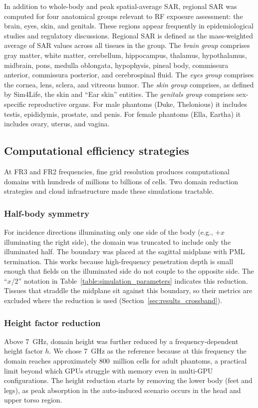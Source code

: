 \documentclass{iopjournal}
\begin{document}
In addition to whole-body and peak spatial-average \gls{SAR}, regional \gls{SAR} was computed for four anatomical groups relevant to \gls{RF} exposure assessment: the brain, eyes, skin, and genitals.
These regions appear frequently in epidemiological studies and regulatory discussions.
Regional \gls{SAR} is defined as the mass-weighted average of \gls{SAR} values across all tissues in the group.
The \emph{brain group} comprises gray matter, white matter, cerebellum, hippocampus, thalamus, hypothalamus, midbrain, pons, medulla oblongata, hypophysis, pineal body, commissura anterior, commissura posterior, and cerebrospinal fluid.
The \emph{eyes group} comprises the cornea, lens, sclera, and vitreous humor.
The \emph{skin group} comprises, as defined by Sim4Life, the skin and ``Ear skin'' entities.
The \emph{genitals group} comprises sex-specific reproductive organs. For male phantoms (Duke, Thelonious) it includes testis, epididymis, prostate, and penis. For female phantoms (Ella, Eartha) it includes ovary, uterus, and vagina.


\subsection{Computational efficiency strategies}
At FR3 and FR2 frequencies, fine grid resolution produces computational domains with hundreds of millions to billions of cells.
Two domain reduction strategies and cloud infrastructure made these simulations tractable.

\subsubsection{Half-body symmetry}
For incidence directions illuminating only one side of the body (e.g., $+x$ illuminating the right side), the domain was truncated to include only the illuminated half.
The boundary was placed at the sagittal midplane with \gls{PML} termination.
This works because high-frequency penetration depth is small enough that fields on the illuminated side do not couple to the opposite side.
The ``$x$/2'' notation in Table~\ref{table:simulation_parameters} indicates this reduction.
Tissues that straddle the midplane sit against this boundary, so their metrics are excluded where the reduction is used (Section~\ref{sec:results_crossband}).

\subsubsection{Height factor reduction}
Above 7~GHz, domain height was further reduced by a frequency-dependent height factor $h$.
We chose 7~GHz as the reference because at this frequency the domain reaches approximately 800~million cells for adult phantoms, a practical limit beyond which GPUs struggle with memory even in multi-GPU configurations.
The height reduction starts by removing the lower body (feet and legs), as peak absorption in the auto-induced scenario occurs in the head and upper torso region.
\end{document}
